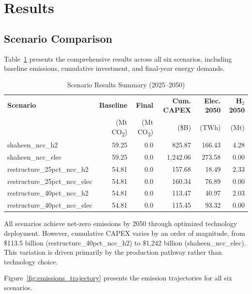 \documentclass[12pt,a4paper]{article}
\newcommand{\COtwo}{CO\textsubscript{2}}
\begin{document}
\section{Results}

\subsection{Scenario Comparison}

Table~\ref{tab:scenario_results} presents the comprehensive results across all six scenarios, including baseline emissions, cumulative investment, and final-year energy demands.

\begin{table}[H]
\centering
\caption{Scenario Results Summary (2025--2050)}
\label{tab:scenario_results}
\begin{tabular}{@{}lrrrrr@{}}
\toprule
\textbf{Scenario} & \textbf{Baseline} & \textbf{Final} & \textbf{Cum. CAPEX} & \textbf{Elec. 2050} & \textbf{H$_2$ 2050} \\
 & (Mt \COtwo) & (Mt \COtwo) & (\$B) & (TWh) & (Mt) \\
\midrule
shaheen\_ncc\_h2 & 59.25 & 0.0 & 825.87 & 166.43 & 4.28 \\
shaheen\_ncc\_elec & 59.25 & 0.0 & 1,242.06 & 273.58 & 0.00 \\
restructure\_25pct\_ncc\_h2 & 54.81 & 0.0 & 157.68 & 18.49 & 2.33 \\
restructure\_25pct\_ncc\_elec & 54.81 & 0.0 & 160.34 & 76.89 & 0.00 \\
restructure\_40pct\_ncc\_h2 & 54.81 & 0.0 & 113.47 & 40.97 & 2.03 \\
restructure\_40pct\_ncc\_elec & 54.81 & 0.0 & 115.45 & 93.32 & 0.00 \\
\bottomrule
\end{tabular}
\end{table}

All scenarios achieve net-zero emissions by 2050 through optimized technology deployment. However, cumulative CAPEX varies by an order of magnitude, from \$113.5 billion (restructure\_40pct\_ncc\_h2) to \$1,242 billion (shaheen\_ncc\_elec). This variation is driven primarily by the production pathway rather than technology choice.

Figure~\ref{fig:emissions_trajectory} presents the emission trajectories for all six scenarios.
\end{document}
